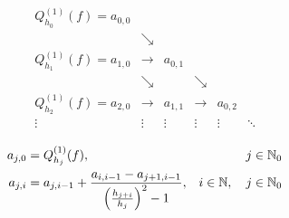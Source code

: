 \begin{align}
\begin{array}{cccccc}
    Q_{h_0}^{(1)}(f) = a_{0,0}
    &&&&& \\
    & \searrow &&&& \\
    Q_{h_1}^{(1)}(f) = a_{1,0}
    & \rightarrow &
    a_{0,1}
    &&& \\
    & \searrow && \searrow && \\
    Q_{h_2}^{(1)}(f) = a_{2,0}
    & \rightarrow &
    a_{1,1}
    & \rightarrow &
    a_{0,2}
    & \\
    \vdots & \vdots & \vdots & \vdots & \vdots & \ddots
\end{array}
\label{neville_aitken}
\end{align}

\begin{align}
    a_{j, 0}
    & = Q_{h_j}^{(1)}(f),
    & j \in \mathbb{N}_0
    \label{rekursions_basis} \\
    a_{j, i}
    & = a_{j, i-1} +
    \frac
    {
        a_{i, i-1} -
        a_{j+1, i-1}
    }{
        \left ( 
            \frac
            {
                h_{j+i}
            }{
                h_j
            }
         \right )^2 -
        1
    },
    & i \in \mathbb{N}, \quad j \in \mathbb{N}_0
    \label{rekursions_schritt}
\end{align}
